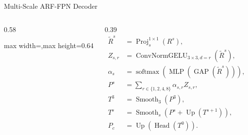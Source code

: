 \begin{frame}{Multi-Scale ARF-FPN Decoder}
\begin{columns}[T,onlytextwidth]
\begin{column}{0.58\textwidth}
\begin{adjustbox}{max width=\textwidth,max height=0.64\textheight}
            \end{adjustbox}
        \end{column}
        \begin{column}{0.39\textwidth}
            \scriptsize
            \begin{align*}
            \tilde{R}^s &= \operatorname{Proj}_{s}^{1\times1}(R^s),\\
            Z_{s,r} &= \operatorname{ConvNormGELU}_{3\times3,d=r}(\tilde{R}^s),\\
            \alpha_s &= \operatorname{softmax}(\operatorname{MLP}(\operatorname{GAP}(\tilde{R}^s))),\\
            P^s &= \sum_{r\in\{1,2,4,8\}}\alpha_{s,r}Z_{s,r},\\
            T^3 &= \operatorname{Smooth}_3(P^3),\\
            T^s &= \operatorname{Smooth}_s(P^s+\operatorname{Up}(T^{s+1})),\\
            P_c &= \operatorname{Up}(\operatorname{Head}(T^0)).
            \end{align*}
        \end{column}
    \end{columns}
\end{frame}

